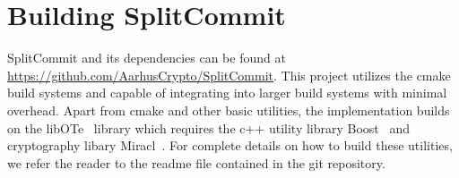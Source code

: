 
\section{Building SplitCommit}

SplitCommit and its dependencies can be found at \url{https://github.com/AarhusCrypto/SplitCommit}. This project utilizes the cmake build systems and capable of integrating into larger build systems with minimal overhead. Apart from cmake and other basic utilities, the implementation builds on the libOTe~\cite{libOTe} library which requires the c++ utility library Boost~\cite{boost} and cryptography libary Miracl~\cite{miracl}. For complete details on how to build these utilities, we refer the reader to the readme file contained in the git repository.

